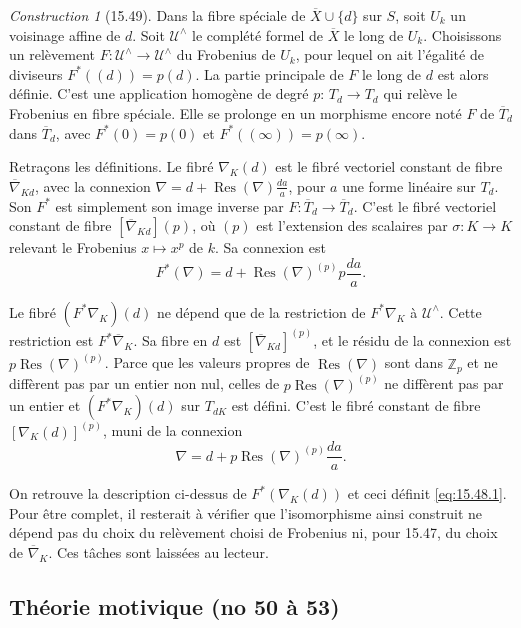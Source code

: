 \documentclass[12pt,a4paper]{article}
\theoremstyle{plain}
\theoremstyle{definition}
\theoremstyle{remark}
\newtheorem{construction}[theorem]{Construction}
\DeclareMathOperator{\Res}{Res}
\newcommand{\bZ}{\mathbb{Z}}
\begin{document}
\begin{construction}[15.49]
Dans la fibre spéciale de $\overline{X} \cup \{d\}$ sur $S$, soit $U_k$ un voisinage affine de $d$. Soit $\mathcal{U}^\wedge$ le complété formel de $\overline{X}$ le long de $U_k$. Choisissons un relèvement $F: \mathcal{U}^\wedge \to \mathcal{U}^\wedge$ du Frobenius de $U_k$, pour lequel on ait l'égalité de diviseurs $F^*((d)) = p(d)$. La partie principale de $F$ le long de $d$ est alors définie. C'est une application homogène de degré $p$: $T_d \to T_d$ qui relève le Frobenius en fibre spéciale. Elle se prolonge en un morphisme encore noté $F$ de $\overline{T}_d$ dans $\overline{T}_d$, avec $F^*(0) = p(0)$ et $F^*((\infty)) = p(\infty)$.

Retraçons les définitions. Le fibré $\nabla_K(d)$ est le fibré vectoriel constant de fibre $\overline{\nabla}_{Kd}$, avec la connexion $\nabla = d + \Res(\nabla) \frac{da}{a}$, pour $a$ une forme linéaire sur $T_d$. Son $F^*$ est simplement son image inverse par $F: \overline{T}_d \to \overline{T}_d$. C'est le fibré vectoriel constant de fibre $[\overline{\nabla}_{Kd}](p)$, où $(p)$ est l'extension des scalaires par $\sigma: K \to K$ relevant le Frobenius $x \mapsto x^p$ de $k$. Sa connexion est
\[
F^*(\nabla) = d + \Res(\nabla)^{(p)} p \frac{da}{a}.
\]

Le fibré $(F^* \nabla_K)(d)$ ne dépend que de la restriction de $F^* \nabla_K$ à $\mathcal{U}^\wedge$. Cette restriction est $F^* \overline{\nabla}_K$. Sa fibre en $d$ est $[\overline{\nabla}_{Kd}]^{(p)}$, et le résidu de la connexion est $p \Res(\nabla)^{(p)}$. Parce que les valeurs propres de $\Res(\nabla)$ sont dans $\bZ_p$ et ne diffèrent pas par un entier non nul, celles de $p \Res(\nabla)^{(p)}$ ne diffèrent pas par un entier et $(F^* \nabla_K)(d)$ sur $T_{dK}$ est défini. C'est le fibré constant de fibre $[\nabla_K(d)]^{(p)}$, muni de la connexion
\[
\nabla = d + p \Res(\nabla)^{(p)} \frac{da}{a}.
\]

On retrouve la description ci-dessus de $F^*(\nabla_K(d))$ et ceci définit \eqref{eq:15.48.1}. Pour être complet, il resterait à vérifier que l'isomorphisme ainsi construit ne dépend pas du choix du relèvement choisi de Frobenius ni, pour 15.47, du choix de $\overline{\nabla}_K$. Ces tâches sont laissées au lecteur.
\end{construction}


\subsection*{Théorie motivique (no 50 à 53)}
\end{document}
